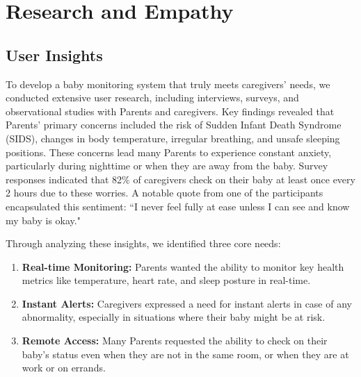 \documentclass[12pt,a4paper]{report}
\begin{document}
\chapter{Research and Empathy}
\section{User Insights}
To develop a baby monitoring system that truly meets caregivers' needs, we conducted extensive user research, including interviews, surveys, and observational studies with Parents and caregivers. Key findings revealed that Parents’ primary concerns included the risk of Sudden Infant Death Syndrome (SIDS), changes in body temperature, irregular breathing, and unsafe sleeping positions. These concerns lead many Parents to experience constant anxiety, particularly during nighttime or when they are away from the baby. Survey responses indicated that 82\% of caregivers check on their baby at least once every 2 hours due to these worries. A notable quote from one of the participants encapsulated this sentiment: ``I never feel fully at ease unless I can see and know my baby is okay."

Through analyzing these insights, we identified three core needs:
\begin{enumerate}
  \item \textbf{Real-time Monitoring:} Parents wanted the ability to monitor key health metrics like temperature, heart rate, and sleep posture in real-time.
  \item \textbf{Instant Alerts:} Caregivers expressed a need for instant alerts in case of any abnormality, especially in situations where their baby might be at risk.
  \item \textbf{Remote Access:} Many Parents requested the ability to check on their baby’s status even when they are not in the same room, or when they are at work or on errands.
\end{enumerate}
\end{document}
